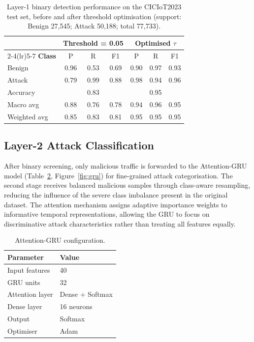 \documentclass{llncs}
\begin{document}
\begin{table}[!htb]
\centering
\caption{Layer-1 binary detection performance on the CICIoT2023 test set, before and after threshold optimisation (support: Benign 27{,}545; Attack 50{,}188; total 77{,}733).}
\label{tab:layer1-results}
\small
\begin{tabular}{lcccccc}
\toprule
& \multicolumn{3}{c}{\textbf{Threshold = 0.05}} & \multicolumn{3}{c}{\textbf{Optimised $\tau$}} \\
\cmidrule(lr){2-4}\cmidrule(lr){5-7}
\textbf{Class} & P & R & F1 & P & R & F1 \\
\midrule
Benign          & 0.96 & 0.53 & 0.69 & 0.90 & 0.97 & 0.93 \\
Attack          & 0.79 & 0.99 & 0.88 & 0.98 & 0.94 & 0.96 \\
\midrule
Accuracy        & \multicolumn{3}{c}{0.83} & \multicolumn{3}{c}{0.95} \\
Macro avg       & 0.88 & 0.76 & 0.78 & 0.94 & 0.96 & 0.95 \\
Weighted avg    & 0.85 & 0.83 & 0.81 & 0.95 & 0.95 & 0.95 \\
\bottomrule
\end{tabular}
\end{table}

\subsection{Layer-2 Attack Classification}

After binary screening, only malicious traffic is forwarded to the Attention-GRU model (Table~\ref{tab:gru}, Figure~\ref{fig:gru}) for fine-grained attack categorisation. The second stage receives balanced malicious samples through class-aware resampling, reducing the influence of the severe class imbalance present in the original dataset. The attention mechanism assigns adaptive importance weights to informative temporal representations, allowing the GRU to focus on discriminative attack characteristics rather than treating all features equally.

\begin{table}[!htb]
\centering
\caption{Attention-GRU configuration.}
\label{tab:gru}
\small
\begin{tabular}{ll}
\toprule
\textbf{Parameter} & \textbf{Value} \\
\midrule
Input features   & 40 \\
GRU units        & 32 \\
Attention layer  & Dense + Softmax \\
Dense layer      & 16 neurons \\
Output           & Softmax \\
Optimiser        & Adam \\
\bottomrule
\end{tabular}
\end{table}
\end{document}
